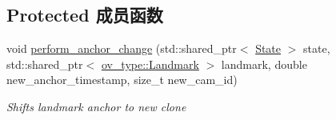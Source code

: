\subsection*{Protected 成员函数}
\begin{DoxyCompactItemize}
\item 
void \hyperlink{classov__msckf_1_1UpdaterSLAM_a4910b23be6e7cf3a9f135330f657c501}{perform\+\_\+anchor\+\_\+change} (std\+::shared\+\_\+ptr$<$ \hyperlink{classov__msckf_1_1State}{State} $>$ state, std\+::shared\+\_\+ptr$<$ \hyperlink{classov__type_1_1Landmark}{ov\+\_\+type\+::\+Landmark} $>$ landmark, double new\+\_\+anchor\+\_\+timestamp, size\+\_\+t new\+\_\+cam\+\_\+id)
\begin{DoxyCompactList}\small\item\em Shifts landmark anchor to new clone \end{DoxyCompactList}\end{DoxyCompactItemize}
